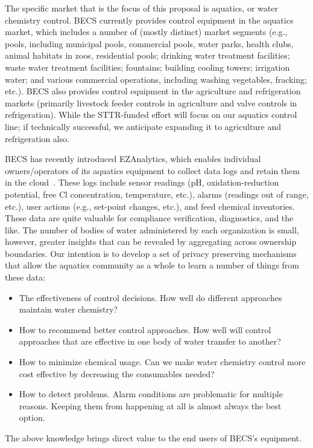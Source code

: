The specific market that is the focus of this proposal is aquatics, or
water chemistry control. BECS currently provides control equipment in
the aquatics market, which includes a number of (mostly distinct)
market segments (e.g., pools, including municipal pools, commercial
pools, water parks, health clubs, animal habitats in zoos, residential pools;
drinking water treatment facilities; waste water treatment facilities;
fountains; building cooling towers; irrigation water; and
various commercial operations, including washing vegetables, fracking; etc.).
BECS also provides control equipment in the
agriculture and refrigeration markets (primarily livestock feeder controls
in agriculture and valve controls in refrigeration).
While the STTR-funded effort will focus on our aquatics control line;
if technically successful, we anticipate expanding it to agriculture
and refrigeration also.

BECS has recently introduced EZAnalytics\texttrademark{}, which enables
individual owners/operators of its aquatics equipment to collect data
logs and retain them in the cloud~\cite{ccgss17}.
These logs include sensor readings (pH, oxidation-reduction potential, free Cl
concentration, temperature, etc.), alarms (readings out of range, etc.),
user actions (e.g., set-point changes, etc.), and feed chemical inventories.
These data are quite valuable for compliance verification, diagnostics,
and the like. 
The number of bodies of water administered by each
organization is small, however, greater insights that can be revealed
by aggregating across ownership boundaries.
Our intention is to develop a set of privacy preserving mechanisms that allow
the aquatics community as a whole to learn a number of things from these
data:
\begin{itemize}
\item The effectiveness of control decisions.  How well do different approaches
maintain water chemistry?
\item How to recommend better control approaches. How well will control
approaches that are effective in one body of water transfer to another?
\item How to minimize chemical usage. Can we make water chemistry control
more cost effective by decreasing the consumables needed?
\item How to detect problems. Alarm conditions are problematic for multiple
reasons.  Keeping them from happening at all is almost always the best option.
\end{itemize}
The above knowledge brings direct value to the end users of BECS's equipment.

